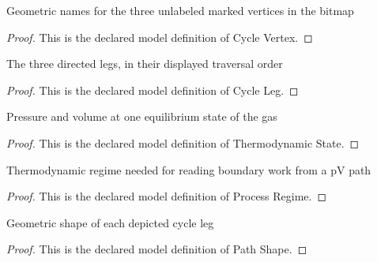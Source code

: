 \begin{definition}
  \label{def:physics:phyx-mini-0417:phyxminiproblems-problemphyxmini0417-cyclevertex}
  Geometric names for the three unlabeled marked vertices in the bitmap
\end{definition}
\begin{proof}
  This is the declared model definition of Cycle Vertex.
\end{proof}
\begin{definition}
  \label{def:physics:phyx-mini-0417:phyxminiproblems-problemphyxmini0417-cycleleg}
  The three directed legs, in their displayed traversal order
\end{definition}
\begin{proof}
  This is the declared model definition of Cycle Leg.
\end{proof}
\begin{definition}
  \label{def:physics:phyx-mini-0417:phyxminiproblems-problemphyxmini0417-thermodynamicstate}
  Pressure and volume at one equilibrium state of the gas
\end{definition}
\begin{proof}
  This is the declared model definition of Thermodynamic State.
\end{proof}
\begin{definition}
  \label{def:physics:phyx-mini-0417:phyxminiproblems-problemphyxmini0417-processregime}
  Thermodynamic regime needed for reading boundary work from a pV path
\end{definition}
\begin{proof}
  This is the declared model definition of Process Regime.
\end{proof}
\begin{definition}
  \label{def:physics:phyx-mini-0417:phyxminiproblems-problemphyxmini0417-pathshape}
  Geometric shape of each depicted cycle leg
\end{definition}
\begin{proof}
  This is the declared model definition of Path Shape.
\end{proof}
